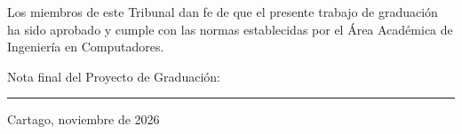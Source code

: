 \vfill

Los miembros de este Tribunal dan fe de que el presente trabajo de graduación
ha sido aprobado y cumple con las normas establecidas por el Área Académica de Ingeniería en Computadores.

\vfill

\begin{center}
  Nota final del Proyecto de Graduación: \rule{3cm}{0.5pt}
\end{center}
\vfill

\begin{center}
  Cartago, noviembre de 2026\par
\end{center}

\cleardoublepage

